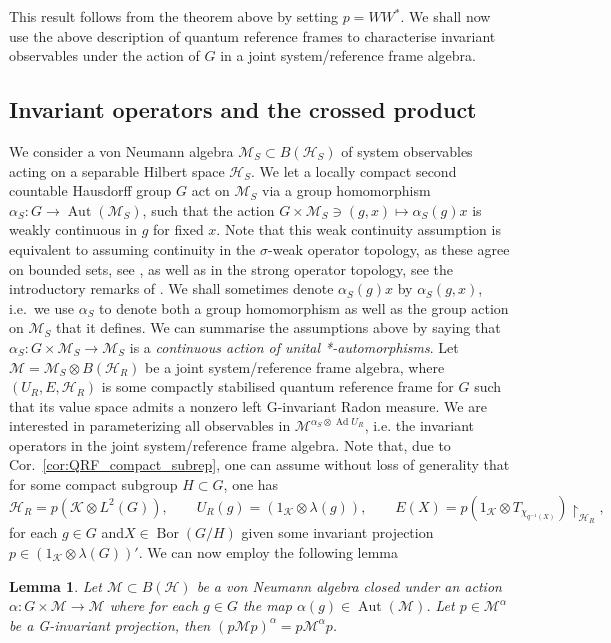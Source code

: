 \documentclass[sn-mathphys-num]{sn-jnl}%
\newcommand{\HH}{\mathcal{H}}
\newcommand{\KK}{\mathcal{K}}
\newcommand{\MM}{\mathcal{M}}
\DeclareMathOperator{\Bor}{Bor}
\DeclareMathOperator{\Ad}{Ad}
\DeclareMathOperator{\Aut}{Aut}
\numberwithin{equation}{section}
\theoremstyle{thmstyleone}%
\newtheorem{lemma}[theorem]{Lemma}
\theoremstyle{thmstyletwo}%
\theoremstyle{thmstylethree}%
\begin{document}
    This result follows from the theorem above by setting $p=WW^*$. We shall now use the above description of quantum reference frames to characterise invariant observables under the action of $G$ in a joint system/reference frame algebra.



    

    \subsection{Invariant operators and the crossed product}
    \label{sec:inv_op_crossed}
    We consider a von Neumann algebra $\MM_S\subset B(\HH_S)$ of system observables acting on a separable Hilbert space $\HH_S$. 
    We let a locally compact second countable Hausdorff group $G$ act on $\MM_S$ via a group homomorphism $\alpha_S:G\to\Aut(\MM_S)$, such that the action $G\times \MM_S\ni(g,x)\mapsto \alpha_S(g)x$ is weakly continuous in $g$ for fixed $x$. Note that this weak continuity assumption is equivalent to assuming continuity in the $\sigma$-weak operator topology, as these agree on bounded sets, see \cite[Lem.~II.2.5]{Takesaki2001}, as well as in the strong operator topology, see the introductory remarks of \cite[Ch.~13.2]{kadison1997fundamentals}. We shall sometimes denote $\alpha_S(g)x$ by $\alpha_S(g,x)$, i.e.~we use $\alpha_S$ to denote both a group homomorphism as well as the group action on $\MM_S$ that it defines. We can summarise the assumptions above by saying that $\alpha_S:G\times\MM_S\to \MM_S$ is a \textit{continuous action of unital *-automorphisms}. 
    Let $\MM=\MM_S\otimes B(\HH_R)$ be a joint system/reference frame algebra, where $(U_R,E,\HH_R)$ is some compactly stabilised quantum reference frame for $G$ such that its value space admits a nonzero left G-invariant Radon measure. 
    We are interested in parameterizing all observables in $\MM^{\alpha_S\otimes\Ad  U_R}$, i.e. the invariant operators in the joint system/reference frame algebra. Note that, due to Cor.\ \ref{cor:QRF_compact_subrep}, one can assume without loss of generality that for some compact subgroup $H\subset G$, one has \begin{equation}
        \HH_R=p(\KK\otimes L^2(G)),\qquad U_R(g)=(1_\KK\otimes\lambda(g)),\qquad E(X)=p(1_\KK\otimes T_{\chi_{q^{-1}(X)}})\restriction_{\HH_R},
    \end{equation}
    for each $g\in G$ and$X\in\Bor(G/H)$ given some invariant projection $p\in (1_\KK\otimes \lambda(G))'$. We can now employ the following lemma
    \begin{lemma}
        Let $\MM\subset B(\HH)$ be a von Neumann algebra closed under an action $\alpha:G\times\MM\to\MM$ where for each $g\in G$ the map $\alpha(g)\in \Aut(\MM)$. Let $p\in \MM^{\alpha}$ be a G-invariant projection, then $(p \MM p)^{\alpha}=p\MM^{\alpha}p$.
    \end{lemma}
\end{document}
